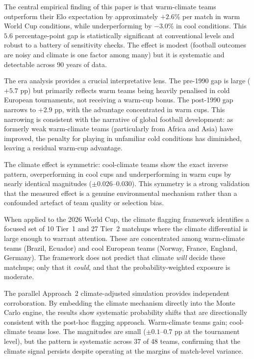 \documentclass[11pt,a4paper]{article}
\begin{document}
The central empirical finding of this paper is that warm-climate teams outperform their Elo expectation by approximately $+2.6\%$ per match in warm World Cup conditions, while underperforming by $-3.0\%$ in cool conditions. This $5.6$ percentage-point gap is statistically significant at conventional levels and robust to a battery of sensitivity checks. The effect is modest (football outcomes are noisy and climate is one factor among many) but it is systematic and detectable across 90 years of data.

The era analysis provides a crucial interpretative lens. The pre-1990 gap is large ($+5.7$ pp) but primarily reflects warm teams being heavily penalised in cold European tournaments, not receiving a warm-cup bonus. The post-1990 gap narrows to $+2.9$ pp, with the advantage concentrated in warm cups. This narrowing is consistent with the narrative of global football development: as formerly weak warm-climate teams (particularly from Africa and Asia) have improved, the penalty for playing in unfamiliar cold conditions has diminished, leaving a residual warm-cup advantage.

The climate effect is symmetric: cool-climate teams show the exact inverse pattern, overperforming in cool cups and underperforming in warm cups by nearly identical magnitudes ($\pm 0.026$--$0.030$). This symmetry is a strong validation that the measured effect is a genuine environmental mechanism rather than a confounded artefact of team quality or selection bias.

When applied to the 2026 World Cup, the climate flagging framework identifies a focused set of 10 Tier~1 and 27 Tier~2 matchups where the climate differential is large enough to warrant attention. These are concentrated among warm-climate teams (Brazil, Ecuador) and cool European teams (Norway, France, England, Germany). The framework does not predict that climate \textit{will} decide these matchups; only that it \textit{could}, and that the probability-weighted exposure is moderate.

The parallel Approach~2 climate-adjusted simulation provides independent corroboration. By embedding the climate mechanism directly into the Monte Carlo engine, the results show systematic probability shifts that are directionally consistent with the post-hoc flagging approach. Warm-climate teams gain; cool-climate teams lose. The magnitudes are small ($\pm 0.1$--$0.7$ pp at the tournament level), but the pattern is systematic across 37 of 48 teams, confirming that the climate signal persists despite operating at the margins of match-level variance.
\end{document}
